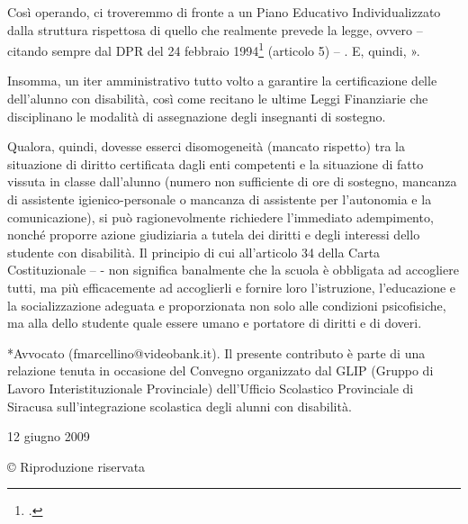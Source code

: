 Così operando, ci troveremmo di fronte a un Piano Educativo Individualizzato dalla struttura rispettosa di quello che realmente prevede la legge, ovvero – citando sempre dal DPR del 24 febbraio 1994\footcite{DPR1994} (articolo 5) – . E, quindi, ».

Insomma, un iter amministrativo tutto volto a garantire la certificazione delle  dell'alunno con disabilità, così come recitano le ultime Leggi Finanziarie che disciplinano le modalità di assegnazione degli insegnanti di sostegno.

Qualora, quindi, dovesse esserci disomogeneità (mancato rispetto) tra la situazione di diritto certificata dagli enti competenti e la situazione di fatto vissuta in classe dall'alunno (numero non sufficiente di ore di sostegno, mancanza di assistente igienico-personale o mancanza di assistente per l'autonomia e la comunicazione), si può ragionevolmente richiedere l'immediato adempimento, nonché proporre azione giudiziaria a tutela dei diritti e degli interessi dello studente con disabilità.
Il principio di cui all'articolo 34 della Carta Costituzionale –  - non significa banalmente che la scuola è obbligata ad accogliere tutti, ma più efficacemente ad accoglierli e fornire loro l'istruzione, l'educazione e la socializzazione adeguata e proporzionata non solo alle condizioni psicofisiche, ma alla  dello studente quale essere umano e portatore di diritti e di doveri.

*Avvocato (fmarcellino@videobank.it). Il presente contributo è parte di una relazione tenuta in occasione del Convegno organizzato dal GLIP (Gruppo di Lavoro Interistituzionale Provinciale) dell'Ufficio Scolastico Provinciale di Siracusa sull'integrazione scolastica degli alunni con disabilità.

12 giugno 2009

© Riproduzione riservata